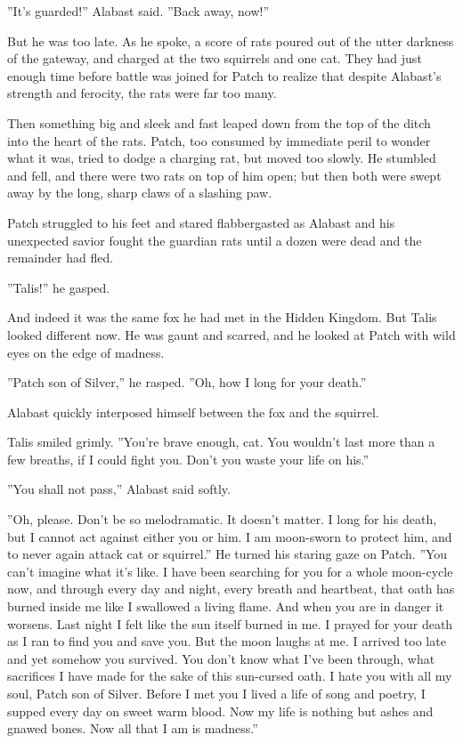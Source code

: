 \documentclass[12pt]{book}
\begin{document}
 ''It's guarded!'' Alabast said. ''Back away, now!''\par
 But he was too late. As he spoke, a score of rats poured out of the utter darkness of the gateway, and charged at the two squirrels and one cat. They had just enough time before battle was joined for Patch to realize that despite Alabast's strength and ferocity, the rats were far too many.\par
 Then something big and sleek and fast leaped down from the top of the ditch into the heart of the rats. Patch, too consumed by immediate peril to wonder what it was, tried to dodge a charging rat, but moved too slowly. He stumbled and fell, and there were two rats on top of him open; but then both were swept away by the long, sharp claws of a slashing paw.\par
Patch struggled to his feet and stared flabbergasted as Alabast and his unexpected savior fought the guardian rats until a dozen were dead and the remainder had fled.\par
 ''Talis!'' he gasped.\par
 And indeed it was the same fox he had met in the Hidden Kingdom. But Talis looked different now. He was gaunt and scarred, and he looked at Patch with wild eyes on the edge of madness.\par
 ''Patch son of Silver,'' he rasped. ''Oh, how I long for your death.''\par
 Alabast quickly interposed himself between the fox and the squirrel.\par
 Talis smiled grimly. ''You're brave enough, cat. You wouldn't last more than a few breaths, if I could fight you. Don't you waste your life on his.''\par
 ''You shall not pass,'' Alabast said softly.\par
 ''Oh, please. Don't be so melodramatic. It doesn't matter. I long for his death, but I cannot act against either you or him. I am moon-sworn to protect him, and to never again attack cat or squirrel.'' He turned his staring gaze on Patch. ''You can't imagine what it's like. I have been searching for you for a whole moon-cycle now, and through every day and night, every breath and heartbeat, that oath has burned inside me like I swallowed a living flame. And when you are in danger it worsens. Last night I felt like the sun itself burned in me. I prayed for your death as I ran to find you and save you. But the moon laughs at me. I arrived too late and yet somehow you survived. You don't know what I've been through, what sacrifices I have made for the sake of this sun-cursed oath. I hate you with all my soul, Patch son of Silver. Before I met you I lived a life of song and poetry, I supped every day on sweet warm blood. Now my life is nothing but ashes and gnawed bones. Now all that I am is madness.''\par
\end{document}
